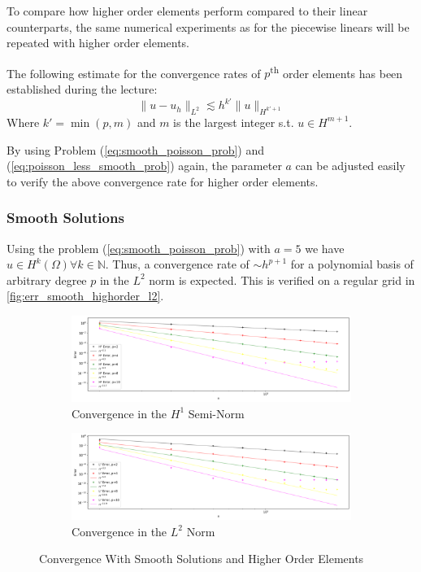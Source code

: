 \documentclass[11pt,a4paper]{article}
\begin{document}
\begin{multicols}{2}
To compare how higher order elements perform compared to their linear counterparts,
the same numerical experiments as for the piecewise linears will be repeated with higher order elements.

The following estimate for the convergence rates of $p$\textsuperscript{th} order
elements has been established during the lecture:
\begin{equation}
  \label{eq:conv_high_order}
  \lVert u - u_h \rVert_{L^2} \lesssim h^{k'} \lVert u \rVert_{H^{k'+1}}
\end{equation}
Where $k' = \operatorname{min}\left(p,m\right)$ and $m$ is the largest integer s.t. $u \in H^{m+1}$.

By using Problem (\ref{eq:smooth_poisson_prob}) and (\ref{eq:poisson_less_smooth_prob})
again, the parameter $a$ can be adjusted easily to verify the above convergence
rate for higher order elements.

\subsubsection*{Smooth Solutions}
Using the problem (\ref{eq:smooth_poisson_prob}) with $a = 5$ we have $u \in H^k(\Omega) \forall k \in \mathbb{N}$.
Thus, a convergence rate of $ \sim h^{p+1}$ for a polynomial basis of arbitrary degree $p$ in the $L^2$ norm is expected.
This is verified on a regular grid in \autoref{fig:err_smooth_highorder_l2}.
\begin{figure}[H]
  \centering
  \begin{subfigure}{1\linewidth}
    \centering
    \includegraphics[width=.8\linewidth]{errors_smooth_highorder_h1}
    \caption{Convergence in the $H^1$ Semi-Norm}
    \label{fig:err_smooth_highorder_h1}
  \end{subfigure}

  \begin{subfigure}{1\linewidth}
    \centering
    \includegraphics[width=.8\linewidth]{errors_smooth_highorder_l2}
    \caption{Convergence in the $L^2$ Norm}
    \label{fig:err_smooth_highorder_l2}
  \end{subfigure}
  \caption{Convergence With Smooth Solutions and Higher Order Elements}
\end{figure}


\end{multicols}
\end{document}
